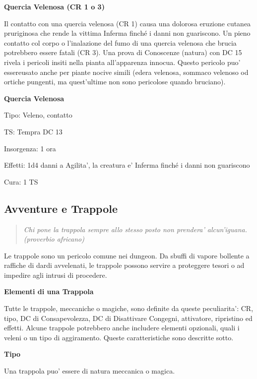 \documentclass[a4paper,11pt,twoside,openany]{book}
\begin{document}
{		\textbf{Quercia Velenosa (CR 1 o 3)}
		
		Il contatto con una quercia velenosa (CR 1) causa una dolorosa eruzione cutanea pruriginosa che rende la vittima Inferma finché i danni non guariscono. Un pieno contatto col corpo o l'inalazione del fumo di una quercia velenosa che brucia potrebbero essere fatali (CR 3). Una prova di Conoscenze (natura) con DC 15 rivela i pericoli insiti nella pianta all'apparenza innocua. Questo pericolo puo' essereusato anche per piante nocive simili (edera velenosa, sommaco velenoso od ortiche pungenti, ma quest'ultime non sono pericolose quando bruciano).
		
		\textbf{Quercia Velenosa}
		
		Tipo: Veleno, contatto
		
		TS: Tempra DC 13
		
		Insorgenza: 1 ora
		
		Effetti: 1d4 danni a Agilita', la creatura e' Inferma finché i danni
		non guariscono
		
		Cura: 1 TS
		
		\pagebreak
		
		\subsection{Avventure e Trappole}
		
		\label{avventure-e-trappole}
		\begin{quote}\textit{
				Chi pone la trappola sempre allo stesso posto non prendera' alcun'iguana. (proverbio africano)
		}\end{quote}
		
		Le trappole sono un pericolo comune nei dungeon. Da sbuffi di vapore bollente a raffiche di dardi avvelenati, le trappole possono servire a proteggere tesori o ad impedire agli intrusi di procedere. 
		
		\textbf{Elementi di una Trappola}
		
		Tutte le trappole, meccaniche o magiche, sono definite da queste peculiarita': CR, tipo, DC di Consapevolezza, DC di Disattivare Congegni, attivatore, ripristino ed effetti. Alcune trappole potrebbero anche includere elementi opzionali, quali i veleni o un tipo di aggiramento. Queste caratteristiche sono descritte sotto.
		
		\textbf{Tipo}
		
		Una trappola puo' essere di natura meccanica o magica.
		
}
\end{document}
